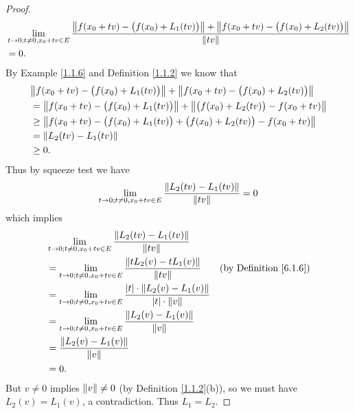 \begin{proof}
    \begin{align*}
         & \lim_{t \to 0 ; t \neq 0, x_0 + tv \in E} \frac{\norm*{f(x_0 + tv) - \big(f(x_0) + L_1(tv)\big)} + \norm*{f(x_0 + tv) - \big(f(x_0) + L_2(tv)\big)}}{\norm*{tv}} \\
         & = 0.
    \end{align*}
    By Example \ref{1.1.6} and Definition \ref{1.1.2} we know that
    \begin{align*}
         & \norm*{f(x_0 + tv) - \big(f(x_0) + L_1(tv)\big)} + \norm*{f(x_0 + tv) - \big(f(x_0) + L_2(tv)\big)}   \\
         & = \norm*{f(x_0 + tv) - \big(f(x_0) + L_1(tv)\big)} + \norm*{\big(f(x_0) + L_2(tv)\big) - f(x_0 + tv)} \\
         & \geq \norm*{f(x_0 + tv) - \big(f(x_0) + L_1(tv)\big) + \big(f(x_0) + L_2(tv)\big) - f(x_0 + tv)}      \\
         & = \norm*{L_2(tv) - L_1(tv)}                                                                           \\
         & \geq 0.
    \end{align*}
    Thus by squeeze test we have
    \[
        \lim_{t \to 0 ; t \neq 0, x_0 + tv \in E} \frac{\norm*{L_2(tv) - L_1(tv)}}{\norm*{tv}} = 0
    \]
    which implies
    \begin{align*}
         & \lim_{t \to 0 ; t \neq 0, x_0 + tv \in E} \frac{\norm*{L_2(tv) - L_1(tv)}}{\norm*{tv}}                                                                   \\
         & = \lim_{t \to 0 ; t \neq 0, x_0 + tv \in E} \frac{\norm*{t L_2(v) - t L_1(v)}}{\norm*{tv}}                          & \text{(by Definition \ref{6.1.6})} \\
         & = \lim_{t \to 0 ; t \neq 0, x_0 + tv \in E} \frac{\abs*{t} \cdot \norm*{L_2(v) - L_1(v)}}{\abs*{t} \cdot \norm*{v}}                                      \\
         & = \lim_{t \to 0 ; t \neq 0, x_0 + tv \in E} \frac{\norm*{L_2(v) - L_1(v)}}{\norm*{v}}                                                                    \\
         & = \frac{\norm*{L_2(v) - L_1(v)}}{\norm*{v}}                                                                                                              \\
         & = 0.
    \end{align*}
    But \(v \neq 0\) implies \(\norm*{v} \neq 0\) (by Definition \ref{1.1.2}(b)), so we must have \(L_2(v) = L_1(v)\), a contradiction.
    Thus \(L_1 = L_2\).
\end{proof}

